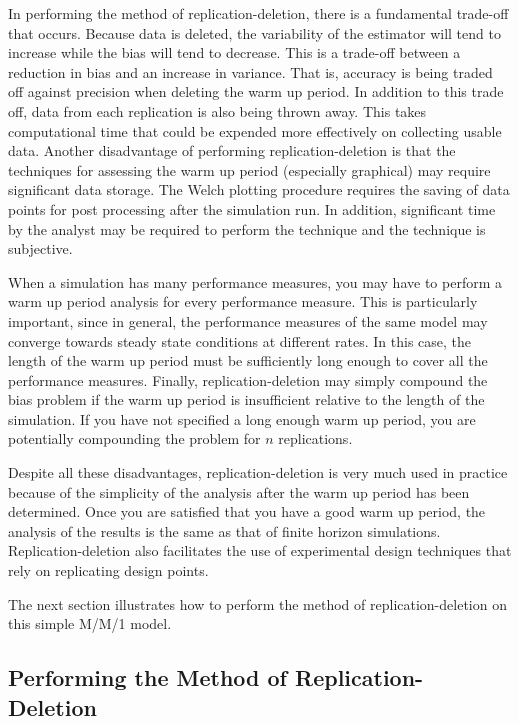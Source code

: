 \documentclass[
]{book}
\theoremstyle{definition}
\theoremstyle{definition}
\theoremstyle{definition}
\theoremstyle{definition}
\theoremstyle{remark}
\begin{document}
In performing the method of replication-deletion, there is a fundamental
trade-off that occurs. Because data is deleted, the variability of the
estimator will tend to increase while the bias will tend to decrease.
This is a trade-off between a reduction in bias and an increase in
variance. That is, accuracy is being traded off against precision when
deleting the warm up period. In addition to this trade off, data from
each replication is also being thrown away. This takes computational
time that could be expended more effectively on collecting usable data.
Another disadvantage of performing replication-deletion is that the
techniques for assessing the warm up period (especially graphical) may
require significant data storage. The Welch plotting procedure requires
the saving of data points for post processing after the simulation run.
In addition, significant time by the analyst may be required to perform
the technique and the technique is subjective.

When a simulation has many performance measures, you may have to perform
a warm up period analysis for every performance measure. This is
particularly important, since in general, the performance measures of
the same model may converge towards steady state conditions at different
rates. In this case, the length of the warm up period must be
sufficiently long enough to cover all the performance measures. Finally,
replication-deletion may simply compound the bias problem if the warm up
period is insufficient relative to the length of the simulation. If you
have not specified a long enough warm up period, you are potentially
compounding the problem for \(n\) replications.

Despite all these disadvantages, replication-deletion is very much used
in practice because of the simplicity of the analysis after the warm up
period has been determined. Once you are satisfied that you have a good
warm up period, the analysis of the results is the same as that of
finite horizon simulations. Replication-deletion also facilitates the
use of experimental design techniques that rely on replicating design
points.

The next section illustrates how to perform the method of
replication-deletion on this simple M/M/1 model.

\hypertarget{simoa:infhorizon:repDeletion}{%
\subsection{Performing the Method of Replication-Deletion}\label{simoa:infhorizon:repDeletion}}
\end{document}
